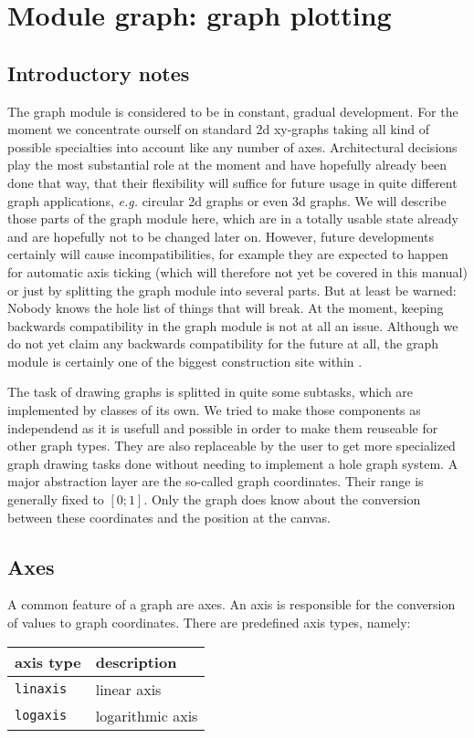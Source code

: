 \chapter{Module graph: graph plotting}
\label{graph}
\section{Introductory notes}
The graph module is considered to be in constant, gradual development.
For the moment we concentrate ourself on standard 2d xy-graphs taking
all kind of possible specialties into account like any number of axes.
Architectural decisions play the most substantial role at the moment
and have hopefully already been done that way, that their flexibility
will suffice for future usage in quite different graph applications,
\emph{e.g.} circular 2d graphs or even 3d graphs. We will describe
those parts of the graph module here, which are in a totally usable
state already and are hopefully not to be changed later on. However,
future developments certainly will cause incompatibilities, for
example they are expected to happen for automatic axis ticking (which
will therefore not yet be covered in this manual) or just by splitting
the graph module into several parts. But at least be warned: Nobody
knows the hole list of things that will break. At the moment, keeping
backwards compatibility in the graph module is not at all an issue.
Although we do not yet claim any backwards compatibility for the
future at all, the graph module is certainly one of the biggest
construction site within \PyX.

The task of drawing graphs is splitted in quite some subtasks, which
are implemented by classes of its own. We tried to make those
components as independend as it is usefull and possible in order to
make them reuseable for other graph types. They are also replaceable
by the user to get more specialized graph drawing tasks done without
needing to implement a hole graph system. A major abstraction layer
are the so-called graph coordinates. Their range is generally fixed to
$[0;1]$. Only the graph does know about the conversion between these
coordinates and the position at the canvas.

\section{Axes}

A common feature of a graph are axes. An axis is responsible for the
conversion of values to graph coordinates. There are predefined axis
types, namely:
\begin{center}
\begin{tabular}{ll}
axis type&description\\
\hline
\texttt{linaxis}&linear axis\\
\texttt{logaxis}&logarithmic axis\\
\end{tabular}
\end{center}

